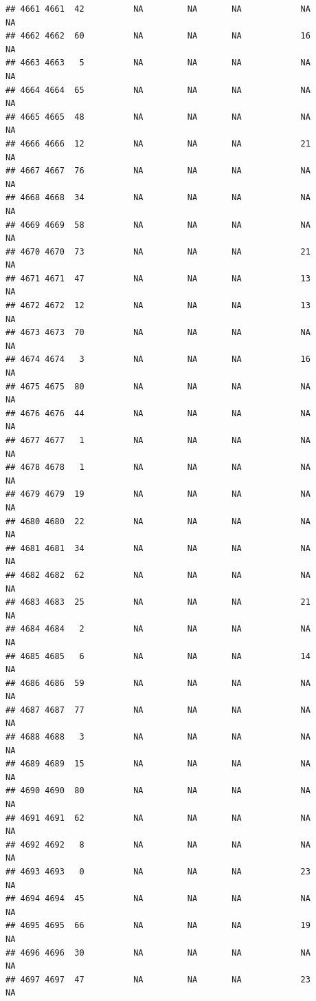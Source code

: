 \documentclass[man]{apa6}
\begin{document}
\begin{verbatim}
## 4661 4661  42          NA         NA       NA            NA       NA
## 4662 4662  60          NA         NA       NA            16       NA
## 4663 4663   5          NA         NA       NA            NA       NA
## 4664 4664  65          NA         NA       NA            NA       NA
## 4665 4665  48          NA         NA       NA            NA       NA
## 4666 4666  12          NA         NA       NA            21       NA
## 4667 4667  76          NA         NA       NA            NA       NA
## 4668 4668  34          NA         NA       NA            NA       NA
## 4669 4669  58          NA         NA       NA            NA       NA
## 4670 4670  73          NA         NA       NA            21       NA
## 4671 4671  47          NA         NA       NA            13       NA
## 4672 4672  12          NA         NA       NA            13       NA
## 4673 4673  70          NA         NA       NA            NA       NA
## 4674 4674   3          NA         NA       NA            16       NA
## 4675 4675  80          NA         NA       NA            NA       NA
## 4676 4676  44          NA         NA       NA            NA       NA
## 4677 4677   1          NA         NA       NA            NA       NA
## 4678 4678   1          NA         NA       NA            NA       NA
## 4679 4679  19          NA         NA       NA            NA       NA
## 4680 4680  22          NA         NA       NA            NA       NA
## 4681 4681  34          NA         NA       NA            NA       NA
## 4682 4682  62          NA         NA       NA            NA       NA
## 4683 4683  25          NA         NA       NA            21       NA
## 4684 4684   2          NA         NA       NA            NA       NA
## 4685 4685   6          NA         NA       NA            14       NA
## 4686 4686  59          NA         NA       NA            NA       NA
## 4687 4687  77          NA         NA       NA            NA       NA
## 4688 4688   3          NA         NA       NA            NA       NA
## 4689 4689  15          NA         NA       NA            NA       NA
## 4690 4690  80          NA         NA       NA            NA       NA
## 4691 4691  62          NA         NA       NA            NA       NA
## 4692 4692   8          NA         NA       NA            NA       NA
## 4693 4693   0          NA         NA       NA            23       NA
## 4694 4694  45          NA         NA       NA            NA       NA
## 4695 4695  66          NA         NA       NA            19       NA
## 4696 4696  30          NA         NA       NA            NA       NA
## 4697 4697  47          NA         NA       NA            23       NA

\end{verbatim}
\end{document}
